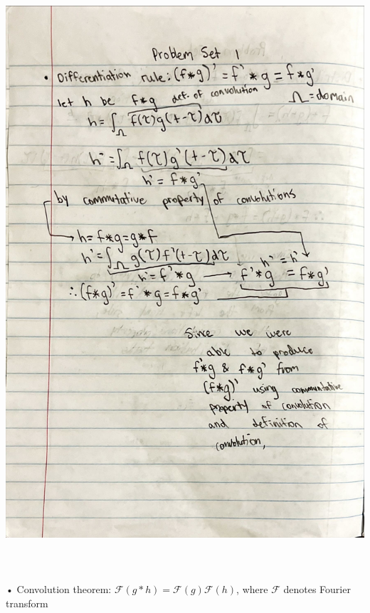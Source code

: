 \documentclass[12pt]{article}
\begin{document}
\includegraphics[scale=0.22]{Differentiation.jpeg}\\\\\\\\
• Convolution theorem: $\mathcal{F}(g*h) = \mathcal{F}(g) \mathcal{F}(h)$, where $\mathcal{F}$
 denotes Fourier transform\\\\
\end{document}
